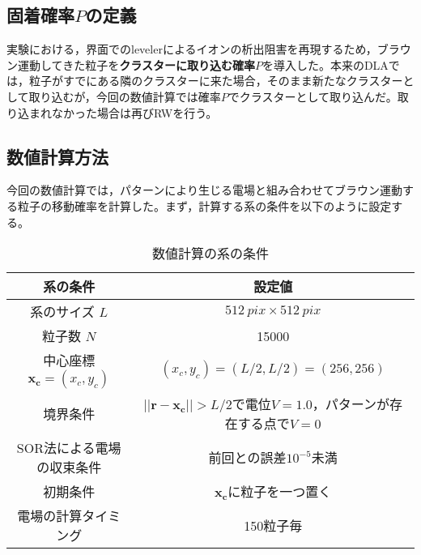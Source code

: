\documentclass[autodetect-engine,dvi=dvipdfmx,a4paper,ja=standard,oneside,openany,11pt,draft]{bxjsbook}
\begin{document}
\subsection{固着確率$P$の定義}
実験における，界面でのlevelerによるイオンの析出阻害を再現するため，ブラウン運動してきた粒子を\textbf{クラスターに取り込む確率$P$}を導入した。本来のDLAでは，粒子がすでにある隣のクラスターに来た場合，そのまま新たなクラスターとして取り込むが，今回の数値計算では確率$P$でクラスターとして取り込んだ。取り込まれなかった場合は再びRWを行う。
\subsection{数値計算方法}
今回の数値計算では，パターンにより生じる電場と組み合わせてブラウン運動する粒子の移動確率を計算した。まず，計算する系の条件を以下のように設定する。
\begin{table}[htbp]
  \centering
  \caption{数値計算の系の条件　}
  \begin{tabular}{|c||c|}
    \hline
    系の条件                      & 設定値                                                  \\ \hline\hline
    系のサイズ $L$                 & $\SI{512}{pix}\times\SI{512}{pix}$                   \\ \hline
    粒子数 $N$                   & 15000                                                \\ \hline
    中心座標 $\bm{x_c}=(x_c,y_c)$ & $(x_c,y_c)=(L/2,L/2)=(256,256)$                      \\ \hline
    境界条件                      & $||\bm{r}-\bm{x_c}||>L/2$で電位$V=1.0$，パターンが存在する点で$V=0$ \\ \hline
    SOR法による電場の収束条件            & 前回との誤差$10^{-5}$未満                                    \\ \hline
    初期条件                      & $\bm{x_c}$に粒子を一つ置く                                   \\ \hline
    電場の計算タイミング                & 150粒子毎                                               \\ \hline
  \end{tabular}
\end{table}
\end{document}
